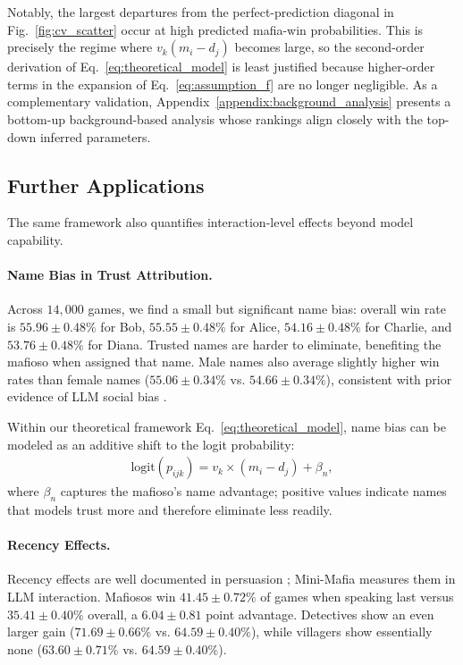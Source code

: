 \documentclass{article}
\begin{document}
Notably, the largest departures from the perfect-prediction diagonal in Fig.~\ref{fig:cv_scatter} occur at high predicted mafia-win probabilities. This is precisely the regime where $v_k(m_i-d_j)$ becomes large, so the second-order derivation of Eq.~\eqref{eq:theoretical_model} is least justified because higher-order terms in the expansion of Eq.~\eqref{eq:assumption_f} are no longer negligible. As a complementary validation, Appendix~\ref{appendix:background_analysis} presents a bottom-up background-based analysis whose rankings align closely with the top-down inferred parameters.

\subsection{Further Applications}
\label{sec:serendipitous_results}

The same framework also quantifies interaction-level effects beyond model capability.

\paragraph{Name Bias in Trust Attribution.}

Across $14{,}000$ games, we find a small but significant name bias: overall win rate is $55.96\pm 0.48\%$ for Bob, $55.55\pm 0.48\%$ for Alice, $54.16\pm 0.48\%$ for Charlie, and $53.76\pm 0.48\%$ for Diana. Trusted names are harder to eliminate, benefiting the mafioso when assigned that name. Male names also average slightly higher win rates than female names ($55.06 \pm 0.34\%$ vs. $54.66 \pm 0.34\%$), consistent with prior evidence of LLM social bias \citep{bai2024social}.

Within our theoretical framework Eq.~\ref{eq:theoretical_model}, name bias can be modeled as an additive shift to the logit probability:
\begin{align}
\text{logit}(p_{ijk}) = v_k \times (m_i - d_j) + \beta_n,
\label{eq:model_with_name_bias}
\end{align}
where $\beta_n$ captures the mafioso's name advantage; positive values indicate names that models trust more and therefore eliminate less readily.

\paragraph{Recency Effects.}

Recency effects are well documented in persuasion \citep{miller1964}; Mini-Mafia measures them in LLM interaction. Mafiosos win $41.45 \pm 0.72\%$ of games when speaking last versus $35.41 \pm 0.40\%$ overall, a $6.04 \pm 0.81$ point advantage. Detectives show an even larger gain ($71.69 \pm 0.66\%$ vs. $64.59 \pm 0.40\%$), while villagers show essentially none ($63.60 \pm 0.71\%$ vs. $64.59 \pm 0.40\%$).
\end{document}
